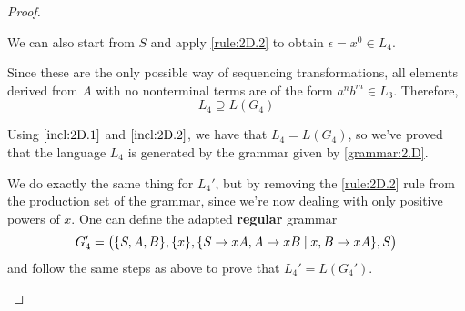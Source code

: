 \documentclass[11pt]{article}
\begin{document}
\begin{proof}
\begin{enumerate}
\begin{enumerate}
            We can also start from $S$ and apply \eqref{rule:2D.2} to obtain
            $\epsilon = x^0 \in L_4$.

            Since these are the only possible way of sequencing transformations, 
            all elements derived from $A$ with no nonterminal terms are of the 
            form $a^nb^{m} \in L_3$. Therefore, 
            \begin{equation}\label{incl:2D.2}
                L_4 \supseteq L(G_4) 
            \end{equation}
        \end{enumerate}
        Using $\eqref{incl:2D.1}$ and $\eqref{incl:2D.2}$, we have that $L_4 = L(G_4)$, so
        we've proved that the language $L_4$ is generated by the grammar given by \eqref{grammar:2.D}.

        We do exactly the same thing for $L_4'$, but by removing the \eqref{rule:2D.2} rule
        from the production set of the grammar, since we're now dealing with only
        positive powers of $x$. One can define the adapted \textbf{regular} grammar
        \begin{equation}
            G_4' = \big(\{S, A, B\}, \{x\}, 
            \{S \to xA, 
            A \to xB \hspace{0.25em}|\hspace{0.25em} x,
            B \to xA\}, S\big)
        \end{equation}
        and follow the same steps as above to prove that $L_4' = L(G_4')$.

        \vspace{1em}


\end{enumerate}
\end{proof}
\end{document}
